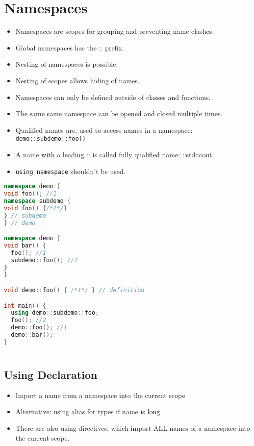 \section{Namespaces}
\begin{itemize}
  \itemsep -0.5em 
  \item Namespaces are scopes for grouping and preventing name clashes.
  \item Global namespaces has the :: prefix.
  \item Nesting of namespaces is possible.
  \item Nesting of scopes allows hiding of names.
  \item Namespaces can only be defined outside of classes and functions.
  \item The same same namespace can be opened and closed multiple times.
  \item Qualified names are. used to access names in a namespace: \lstinline|demo::subdemo::foo()|
  \item A name with a leading :: is called fully qualified name: ::std::cout.
  \item \lstinline|using namespace| shouldn't be used.
\end{itemize}
\begin{lstlisting}[language=C++]
namespace demo {
void foo(); //1
namespace subdemo {
void foo() {/*2*/}
} // subdemo
} // demo

namespace demo {
void bar() {
  foo(); //1
  subdemo::foo(); //2
}
}

void demo::foo() { /*1*/ } // definition

int main() {
  using demo::subdemo::foo;
  foo(); //2
  demo::foo(); //1
  demo::bar();
}
	
\end{lstlisting}

\subsection{Using Declaration}
\begin{itemize}
  \itemsep -0.5em 
  \item Import a name from a namespace into the current scope
  \item Alternative: using alias for types if name is long
  \item There are also using directives, which import ALL names of a namespace into the current scope.
\end{itemize}

